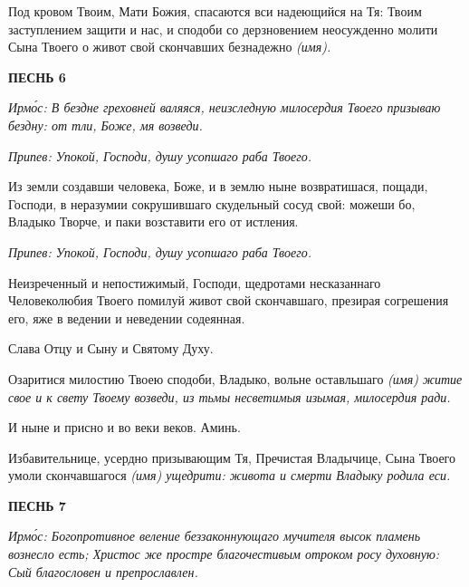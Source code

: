    Под кровом Твоим, Мати Божия, спасаются вси надеющийся на
Тя: Твоим заступлением защити и нас, и сподоби со дерзновением
неосужденно молити Сына Твоего о живот свой скончавших безнадежно \itshape 
(имя)\normalfont{}.



 

\bfseries ПЕСНЬ 6\normalfont{}


 \itshape Ирмо́с:\normalfont{} В бездне греховней валяяся, неизследную милосердия Твоего призываю
бездну: от тли, Боже, мя возведи.



 \itshape Припев:\normalfont{} Упокой, Господи, душу усопшаго раба Твоего.



   Из земли создавши человека, Боже, и в землю ныне возвратишася,
пощади, Господи, в неразумии сокрушившаго скудельный сосуд свой:
можеши бо, Владыко Творче, и паки возставити его от истления.



 \itshape Припев:\normalfont{} Упокой, Господи, душу усопшаго раба Твоего.



   Неизреченный и непостижимый, Господи, щедротами несказаннаго
Человеколюбия Твоего помилуй живот свой скончавшаго, презирая
согрешения его, яже в ведении и неведении содеянная.



   Слава Отцу и Сыну и Святому Духу.



   Озаритися милостию Твоею сподоби, Владыко, вольне оставльшаго \itshape 
(имя)\normalfont{} житие свое и к свету Твоему возведи, из тьмы несветимыя изымая,
милосердия ради.




   И ныне и присно и во веки веков. Аминь.



   Избавительнице, усердно призывающим Тя, Пречистая Владычице, Сына
Твоего умоли скончавшагося \itshape  (имя)\normalfont{} ущедрити: живота и смерти Владыку
родила еси.



 

\bfseries ПЕСНЬ 7\normalfont{}


 \itshape Ирмо́с:\normalfont{} Богопротивное веление беззаконнующаго мучителя высок пламень
вознесло есть; Христос же простре благочестивым отроком росу духовную: Сый
благословен и препрославлен.




